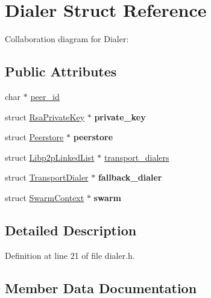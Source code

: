 \hypertarget{struct_dialer}{}\section{Dialer Struct Reference}
\label{struct_dialer}


Collaboration diagram for Dialer\+:
\subsection*{Public Attributes}
\begin{DoxyCompactItemize}
\item 
char $\ast$ \mbox{\hyperlink{struct_dialer_a811fe81af9ee5fae479fe882382d0358}{peer\+\_\+id}}
\item 
\mbox{\label{struct_dialer_a4540eb63e7a6d68fada23efbb3a8a4d6}} 
struct \mbox{\hyperlink{struct_rsa_private_key}{Rsa\+Private\+Key}} $\ast$ {\bfseries private\+\_\+key}
\item 
\mbox{\label{struct_dialer_a581534a5cdd4cfae612653eee205f44a}} 
struct \mbox{\hyperlink{struct_peerstore}{Peerstore}} $\ast$ {\bfseries peerstore}
\item 
struct \mbox{\hyperlink{struct_libp2p_linked_list}{Libp2p\+Linked\+List}} $\ast$ \mbox{\hyperlink{struct_dialer_af12449c90dc5db2d516e4e1275dfdcae}{transport\+\_\+dialers}}
\item 
\mbox{\label{struct_dialer_a2858b957387324b3da563376ab71dee2}} 
struct \mbox{\hyperlink{struct_transport_dialer}{Transport\+Dialer}} $\ast$ {\bfseries fallback\+\_\+dialer}
\item 
\mbox{\label{struct_dialer_aac0e996dd62cb6921e4f86c8b37825e4}} 
struct \mbox{\hyperlink{struct_swarm_context}{Swarm\+Context}} $\ast$ {\bfseries swarm}
\end{DoxyCompactItemize}


\subsection{Detailed Description}


Definition at line 21 of file dialer.\+h.



\subsection{Member Data Documentation}
\mbox{\label{struct_dialer_a811fe81af9ee5fae479fe882382d0358}} 
